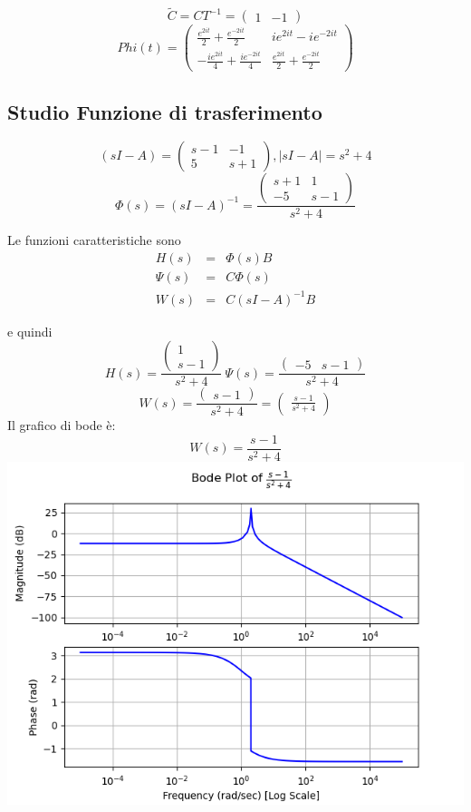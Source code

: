 \documentclass{article}
\begin{document}
\[ \widetilde{C} = C T^{-1} = \left(\begin{matrix}1 & -1\end{matrix}\right) \]
\[Phi(t) = \left(\begin{matrix}\frac{e^{2 i t}}{2} + \frac{e^{- 2 i t}}{2} & i e^{2 i t} - i e^{- 2 i t}\\- \frac{i e^{2 i t}}{4} + \frac{i e^{- 2 i t}}{4} & \frac{e^{2 i t}}{2} + \frac{e^{- 2 i t}}{2}\end{matrix}\right) \]

\subsection{Studio Funzione di trasferimento}

\[ (sI-A) = \left(\begin{matrix}s - 1 & -1\\5 & s + 1\end{matrix}\right), |sI-A| = s^{2} + 4 \]
\[ \Phi(s) = (sI-A)^{-1} = \frac{\left(\begin{matrix}s + 1 & 1\\-5 & s - 1\end{matrix}\right)}{s^{2} + 4} \]

Le funzioni caratteristiche sono \[\begin{array}{rcl}  H(s) & = & \Phi(s)B \\ \Psi(s) & = & C \Phi(s)\\ W(s) & = & C(sI-A)^{-1}B  \end{array} \]

e quindi \[ H(s)  =  \frac{\left(\begin{matrix}1\\s - 1\end{matrix}\right)}{s^{2} + 4} \ \Psi(s) = \frac{\left(\begin{matrix}-5 & s - 1\end{matrix}\right)}{s^{2} + 4} \]
\[ W(s)  =  \frac{\left(\begin{matrix}s - 1\end{matrix}\right)}{s^{2} + 4} = \left(\begin{matrix}\frac{s - 1}{s^{2} + 4}\end{matrix}\right)  \] 
Il grafico di bode è:
\[ W(s) = \frac{s - 1}{s^{2} + 4} \]\includegraphics[scale = 0.5]{figures/bode_1450369.png}
\end{document}
